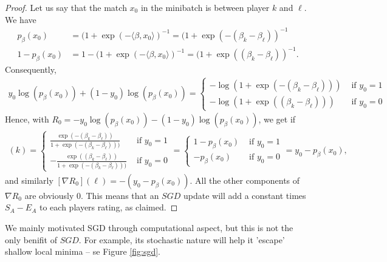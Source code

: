 \documentclass{article}
\newcommand{\sprod}[1]{\langle #1 \rangle}
\begin{document}
\begin{proof}
    Let us say that the match $x_0$ in the minibatch is between player $k$ and $\ell$. We have
    \begin{align*}
        p_\beta(x_0) &= (1+\exp(-\sprod{\beta,x_0})^{-1} = (1+\exp(-(\beta_k-\beta_\ell))^{-1} \\
        1-p_\beta(x_0) &= 1- (1+\exp(-\sprod{\beta,x_0})^{-1} = (1+\exp((\beta_k-\beta_\ell))^{-1}.
    \end{align*}
    Consequently,
    \begin{align*}
        y_0 \log(p_\beta(x_0)) + (1-y_0) \log(p_\beta(x_0)) =\begin{cases}
            - \log(1+\exp(-(\beta_k-\beta_\ell)))  &\text{ if $y_0=1$} \\
            -\log(1+\exp((\beta_k-\beta_\ell)))  &\text{ if $y_0=0$}
        \end{cases} 
    \end{align*}
    Hence, with $R_0 = - y_0 \log(p_\beta(x_0)) - (1-y_0) \log(p_\beta(x_0))$, we get if
    \begin{align*}
        [\nabla R_0](k) = \begin{cases}
            \frac{\exp(-(\beta_k-\beta_\ell))}{ 1+\exp(-(\beta_k-\beta_\ell)))}  &\text{ if $y_0=1$} \\
            -\frac{\exp((\beta_k-\beta_\ell))}{ 1+\exp(-(\beta_k-\beta_\ell)))}  &\text{ if $y_0=0$}
            \end{cases} = \begin{cases}
                1-p_\beta(x_0)  &\text{ if $y_0=1$} \\
            - p_\beta(x_0) &\text{ if $y_0=0$}
            \end{cases} = y_0 - p_\beta(x_0),
    \end{align*}
    and similarly  $[\nabla R_0](\ell) = -(y_0 - p_\beta(x_0))$. All the other components of $\nabla R_0$ are obviously $0$. This means that an $SGD$ update will add a constant times $S_A-E_A$ to each players rating, as claimed.
\end{proof}




We mainly motivated SGD through computational aspect, but this is not the only benifit of $SGD$. For example, its stochastic nature will help it 'escape' shallow local minima -- se Figure \ref{fig:sgd}.
\end{document}
